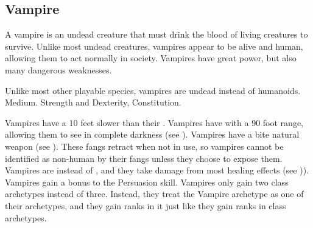 


    \subsection{Vampire}
        A vampire is an undead creature that must drink the blood of living creatures to survive.
        Unlike most undead creatures, vampires appear to be alive and human, allowing them to act normally in society.
        Vampires have great power, but also many dangerous weaknesses.

         Unlike most other playable species, vampires are undead instead of humanoids.
         Medium.
          Strength and Dexterity,  Constitution.
        \begin{itemize}
             Vampires have a  10 feet slower than their .
             Vampires have  with a 90 foot range, allowing them to see in complete darkness (see ).
             Vampires have a bite natural weapon (see ).
                These fangs retract when not in use, so vampires cannot be identified as non-human by their fangs unless they choose to expose them.
             Vampires are  instead of , and they take damage from most healing effects (see )).
             Vampires gain a  bonus to the Persuasion skill.
             Vampires only gain two class archetypes instead of three.
                Instead, they treat the Vampire archetype as one of their archetypes, and they gain ranks in it just like they gain ranks in class archetypes.
        \end{itemize}

